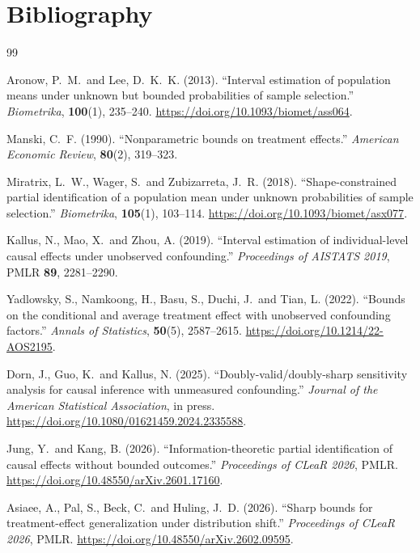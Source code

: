 \documentclass[11pt]{article}
\theoremstyle{definition}
\theoremstyle{plain}
\theoremstyle{remark}
\begin{document}
\section*{Bibliography}
\begin{thebibliography}{99}

Aronow, P.~M.\ and Lee, D.~K.~K. (2013).
``Interval estimation of population means under unknown but bounded
probabilities of sample selection.''
\emph{Biometrika}, \textbf{100}(1), 235--240.
\url{https://doi.org/10.1093/biomet/ass064}.

Manski, C.~F. (1990).
``Nonparametric bounds on treatment effects.''
\emph{American Economic Review}, \textbf{80}(2), 319--323.

Miratrix, L.~W., Wager, S.\ and Zubizarreta, J.~R. (2018).
``Shape-constrained partial identification of a population mean under unknown
probabilities of sample selection.''
\emph{Biometrika}, \textbf{105}(1), 103--114.
\url{https://doi.org/10.1093/biomet/asx077}.

Kallus, N., Mao, X.\ and Zhou, A. (2019).
``Interval estimation of individual-level causal effects under unobserved
confounding.''
\emph{Proceedings of AISTATS 2019}, PMLR \textbf{89}, 2281--2290.

Yadlowsky, S., Namkoong, H., Basu, S., Duchi, J.\ and Tian, L. (2022).
``Bounds on the conditional and average treatment effect with unobserved
confounding factors.''
\emph{Annals of Statistics}, \textbf{50}(5), 2587--2615.
\url{https://doi.org/10.1214/22-AOS2195}.

Dorn, J., Guo, K.\ and Kallus, N. (2025).
``Doubly-valid/doubly-sharp sensitivity analysis for causal inference with
unmeasured confounding.''
\emph{Journal of the American Statistical Association}, in press.
\url{https://doi.org/10.1080/01621459.2024.2335588}.

Jung, Y.\ and Kang, B. (2026).
``Information-theoretic partial identification of causal effects without
bounded outcomes.''
\emph{Proceedings of CLeaR 2026}, PMLR.
\url{https://doi.org/10.48550/arXiv.2601.17160}.

Asiaee, A., Pal, S., Beck, C.\ and Huling, J.~D. (2026).
``Sharp bounds for treatment-effect generalization under distribution shift.''
\emph{Proceedings of CLeaR 2026}, PMLR.
\url{https://doi.org/10.48550/arXiv.2602.09595}.


\end{thebibliography}
\end{document}
